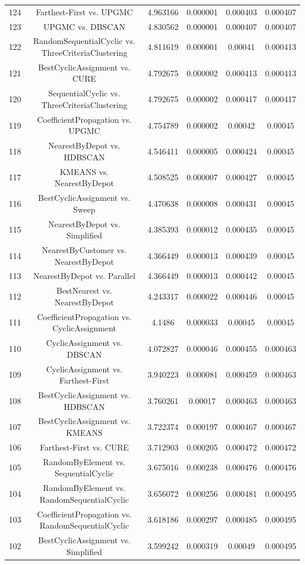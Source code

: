 \documentclass[a4paper,10pt]{article}
\begin{document}
\begin{landscape}
\begin{table}[!htp]
\begin{tabular}{cccccc}
124&Farthest-First vs. UPGMC&4.963166&0.000001&0.000403&0.000407\\
123&UPGMC vs. DBSCAN&4.830562&0.000001&0.000407&0.000407\\
122&RandomSequentialCyclic vs. ThreeCriteriaClustering&4.811619&0.000001&0.00041&0.000413\\
121&BestCyclicAssignment vs. CURE&4.792675&0.000002&0.000413&0.000413\\
120&SequentialCyclic vs. ThreeCriteriaClustering&4.792675&0.000002&0.000417&0.000417\\
119&CoefficientPropagation vs. UPGMC&4.754789&0.000002&0.00042&0.00045\\
118&NearestByDepot vs. HDBSCAN&4.546411&0.000005&0.000424&0.00045\\
117&KMEANS vs. NearestByDepot&4.508525&0.000007&0.000427&0.00045\\
116&BestCyclicAssignment vs. Sweep&4.470638&0.000008&0.000431&0.00045\\
115&NearestByDepot vs. Simplified&4.385393&0.000012&0.000435&0.00045\\
114&NearestByCustomer vs. NearestByDepot&4.366449&0.000013&0.000439&0.00045\\
113&NearestByDepot vs. Parallel&4.366449&0.000013&0.000442&0.00045\\
112&BestNearest vs. NearestByDepot&4.243317&0.000022&0.000446&0.00045\\
111&CoefficientPropagation vs. CyclicAssignment&4.1486&0.000033&0.00045&0.00045\\
110&CyclicAssignment vs. DBSCAN&4.072827&0.000046&0.000455&0.000463\\
109&CyclicAssignment vs. Farthest-First&3.940223&0.000081&0.000459&0.000463\\
108&BestCyclicAssignment vs. HDBSCAN&3.760261&0.00017&0.000463&0.000463\\
107&BestCyclicAssignment vs. KMEANS&3.722374&0.000197&0.000467&0.000467\\
106&Farthest-First vs. CURE&3.712903&0.000205&0.000472&0.000472\\
105&RandomByElement vs. SequentialCyclic&3.675016&0.000238&0.000476&0.000476\\
104&RandomByElement vs. RandomSequentialCyclic&3.656072&0.000256&0.000481&0.000495\\
103&CoefficientPropagation vs. RandomSequentialCyclic&3.618186&0.000297&0.000485&0.000495\\
102&BestCyclicAssignment vs. Simplified&3.599242&0.000319&0.00049&0.000495\\

\end{tabular}
\end{table}
\end{landscape}
\end{document}
